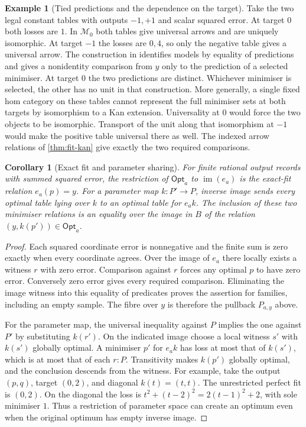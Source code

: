 \documentclass[11pt,a4paper]{article}
\newtheorem{corollary}[corollary]{Corollary}
\theoremstyle{definition}
\newtheorem{example}[example]{Example}
\theoremstyle{remark}\newaliascnt{remark}{theorem}
\numberwithin{equation}{section}
\begin{document}
\begin{example}[Tied predictions and the dependence on the target]\label{ex:fit-kan-tie}
Take the two legal constant tables with outputs \(-1,+1\) and scalar squared error. At target \(0\) both losses are \(1\). In \(\mathcal M_0\) both tables give universal arrows and are uniquely isomorphic. At target \(-1\) the losses are \(0,4\), so only the negative table gives a universal arrow. The construction in \cite[proof of Theorem 4.1]{pugh-kan} identifies models by equality of predictions and gives a nonidentity comparison from \(y\) only to the prediction of a selected minimiser. At target $0$ the two predictions are distinct. Whichever minimiser is selected, the other has no unit in that construction. More generally, a single fixed hom category on these tables cannot represent the full minimiser sets at both targets by isomorphism to a Kan extension. Universality at \(0\) would force the two objects to be isomorphic. Transport of the unit along that isomorphism at \(-1\) would make the positive table universal there as well. The indexed arrow relations of \cref{thm:fit-kan} give exactly the two required comparisons.
\end{example}

\begin{corollary}[Exact fit and parameter sharing]\label{cor:fit-kan-exact}
For finite rational output records with summed squared error, the restriction of \(\mathsf{Opt}_a\) to \(\operatorname{im}(e_a)\) is the exact-fit relation \(e_a(p)=y\). For a parameter map \(k:P'\to P\), inverse image sends every optimal table lying over \(k\) to an optimal table for \(e_a k\). The inclusion of these two minimiser relations is an equality over the image in \(B\) of the relation \( (y,k(p'))\in\mathsf{Opt}_a\).
\end{corollary}
\begin{proof}
Each squared coordinate error is nonnegative and the finite sum is zero exactly when every coordinate agrees. Over the image of \(e_a\) there locally exists a witness \(r\) with zero error. Comparison against \(r\) forces any optimal \(p\) to have zero error. Conversely zero error gives every required comparison. Eliminating the image witness into this equality of predicates proves the assertion for families, including an empty sample. The fibre over \(y\) is therefore the pullback \(P_{a,y}\) above.

For the parameter map, the universal inequality against \(P\) implies the one against \(P'\) by substituting \(k(r')\). On the indicated image choose a local witness \(s'\) with \(k(s')\) globally optimal. A minimiser \(p'\) for \(e_a k\) has loss at most that of \(k(s')\), which is at most that of each \(r:P\). Transitivity makes \(k(p')\) globally optimal, and the conclusion descends from the witness. For example, take the output \((p,q)\), target \((0,2)\), and diagonal \(k(t)=(t,t)\). The unrestricted perfect fit is \((0,2)\). On the diagonal the loss is \(t^2+(t-2)^2=2(t-1)^2+2\), with sole minimiser \(1\). Thus a restriction of parameter space can create an optimum even when the original optimum has empty inverse image.
\end{proof}
\end{document}
